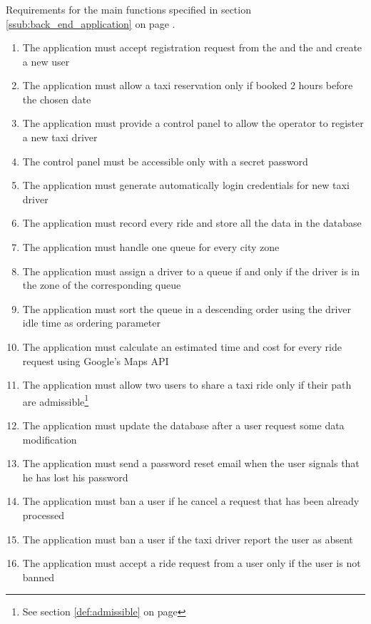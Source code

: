 \subsubsection{}
\label{subs:backend_requirements}
Requirements for the main functions specified in section \ref{ssub:back_end_application} on page \pageref{ssub:back_end_application}.
\begin{enumerate}[resume*]
	\item The application must accept registration request from the  and the  and create a new user
	\item The application must allow a taxi reservation only if booked 2 hours before the chosen date
	\item The application must provide a control panel to allow the operator to register a new taxi driver
	\item The control panel must be accessible only with a secret password
	\item The application must generate automatically login credentials for new taxi driver
	\item The application must record every ride and store all the data in the database
	\item The application must handle one queue for every city zone
	\item The application must assign a driver to a queue if and only if the driver is in the zone of the corresponding queue
	\item The application must sort the queue in a descending order using the driver idle time as ordering parameter
	\item The application must calculate an estimated time and cost for every ride request using Google's Maps API
	\item The application must allow two users to share a taxi ride only if their path are admissible\footnote{See section \ref{def:admissible} on page \pageref{def:admissible}}
	\item The application must update the database after a user request some data modification
	\item The application must send a password reset email when the user signals that he has lost his password
	\item The application must ban a user if he cancel a request that has been already processed
	\item The application must ban a user if the taxi driver report the user as absent
	\item The application must accept a ride request from a user only if the user is not banned 

\end{enumerate}
